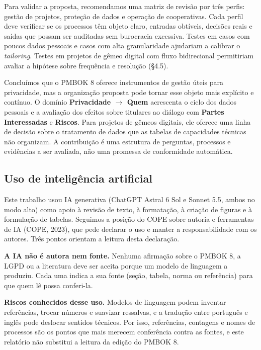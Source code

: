 \documentclass[12pt,a4paper,article,oneside,english,brazil]{abntex2}
\newif\ifavisofinal  \avisofinaltrue    %
\begin{document}
Para validar a proposta, recomendamos uma matriz de revisão por três perfis: gestão de projetos, proteção de dados e operação de cooperativas. Cada perfil deve verificar se os processos têm objeto claro, entradas obtíveis, decisões reais e saídas que possam ser auditadas sem burocracia excessiva. Testes em casos com poucos dados pessoais e casos com alta granularidade ajudariam a calibrar o \textit{tailoring}. Testes em projetos de gêmeo digital com fluxo bidirecional permitiriam avaliar a hipótese sobre frequência e resolução (§4.5).

Concluímos que o PMBOK 8 oferece instrumentos de gestão úteis para privacidade, mas a organização proposta pode tornar esse objeto mais explícito e contínuo. O domínio \textbf{Privacidade \ensuremath{\rightarrow} Quem} acrescenta o ciclo dos dados pessoais e a avaliação dos efeitos sobre titulares ao diálogo com \textbf{Partes Interessadas} e \textbf{Riscos}. Para projetos de gêmeos digitais, ele oferece uma linha de decisão sobre o tratamento de dados que as tabelas de capacidades técnicas não organizam. A contribuição é uma estrutura de perguntas, processos e evidências a ser avaliada, não uma promessa de conformidade automática.

\ifavisofinal
\subsection{Uso de inteligência artificial}

Este trabalho usou IA generativa (ChatGPT Astral 6 Sol e Sonnet 5.5, ambos no modo alto) como apoio à revisão de texto, à formatação, à criação de figuras e à formulação de tabelas. Seguimos a posição do COPE sobre autoria e ferramentas de IA (COPE, 2023), que pede declarar o uso e manter a responsabilidade com os autores. Três pontos orientam a leitura desta declaração.

\textbf{A IA não é autora nem fonte.} Nenhuma afirmação sobre o PMBOK 8, a LGPD ou a literatura deve ser aceita porque um modelo de linguagem a produziu. Cada uma indica a sua fonte (seção, tabela, norma ou referência) para que quem lê possa conferi-la.

\textbf{Riscos conhecidos desse uso.} Modelos de linguagem podem inventar referências, trocar números e suavizar ressalvas, e a tradução entre português e inglês pode deslocar sentidos técnicos. Por isso, referências, contagens e nomes de processos são os pontos que mais merecem conferência contra as fontes, e este relatório não substitui a leitura da edição do PMBOK 8.
\end{document}
